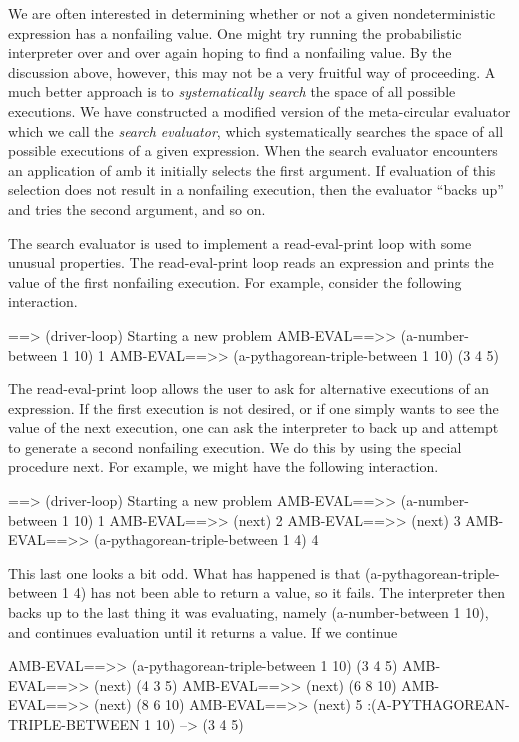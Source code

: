 We are often interested in determining whether or not a given nondeterministic
expression has a nonfailing value.  One might try running the
probabilistic interpreter over and over again hoping to find a
nonfailing value.  By the discussion above, however, this may not be a
very fruitful way of proceeding.  A much better approach is 
to {\em systematically search} the space of all possible executions.
We have constructed a modified version of the meta-circular evaluator
which we call the {\em search evaluator}, which
systematically searches the space of all possible executions of a
given expression. When the search evaluator encounters an application
of {\cf amb} it initially selects the first argument.  If evaluation
of this selection does not result in a nonfailing execution, then the
evaluator ``backs up'' and tries the second argument, and so on.  

The search evaluator is used to implement a read-eval-print loop with some
unusual properties.  The read-eval-print loop reads an expression and
prints the value of the first nonfailing execution.  For example,
consider the following interaction.

\beginlisp
==> (driver-loop)
Starting a new problem
\null
AMB-EVAL==>> (a-number-between 1 10)
1
\null
AMB-EVAL==>> (a-pythagorean-triple-between 1 10)
(3 4 5)
\endlisp

The read-eval-print loop allows the user to ask for alternative executions
of an expression.  If the first execution is not desired, or if one simply
wants to see the value of the next execution, one can ask the interpreter to
back up and attempt to generate a second nonfailing execution.  We do
this by using the special procedure {\cf next}.  For example,
we might have the following interaction.

\beginlisp
==> (driver-loop)
Starting a new problem
\null
AMB-EVAL==>> (a-number-between 1 10)
1
\null
AMB-EVAL==>> (next)
2
\null
AMB-EVAL==>> (next)
3
\null
AMB-EVAL==>> (a-pythagorean-triple-between 1 4)
4
\endlisp

This last one looks a bit odd. What has happened is that {\cf
(a-pythagorean-triple-between 1 4)} has not been able to return a value,
so it fails.  The interpreter then backs up to the last thing it was
evaluating, namely {\cf (a-number-between 1 10)}, and continues
evaluation until it returns a value.  If we continue 

\beginlisp
AMB-EVAL==>> (a-pythagorean-triple-between 1 10)
(3 4 5)
\null
AMB-EVAL==>> (next)
(4 3 5)
\null
AMB-EVAL==>> (next)
(6 8 10)
\null
AMB-EVAL==>> (next)
(8 6 10)
\null
AMB-EVAL==>> (next)
5
:(A-PYTHAGOREAN-TRIPLE-BETWEEN 1 10) --> (3 4 5)
\endlisp

